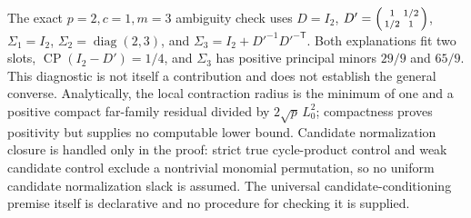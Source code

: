 The exact \(p=2,c=1,m=3\) ambiguity check uses \(D=I_2\), \(D'=\begin{psmallmatrix}1&1/2\\1/2&1\end{psmallmatrix}\), \(\Sigma_1=I_2\), \(\Sigma_2=\operatorname{diag}(2,3)\), and \(\Sigma_3=I_2+D'^{-1}D'^{-\mathsf T}\). Both explanations fit two slots, \(\operatorname{CP}(I_2-D')=1/4\), and \(\Sigma_3\) has positive principal minors \(29/9\) and \(65/9\). This diagnostic is not itself a contribution and does not establish the general converse. Analytically, the local contraction radius is the minimum of one and a positive compact far-family residual divided by \(2\sqrt p\,L_0^2\); compactness proves positivity but supplies no computable lower bound. Candidate normalization closure is handled only in the proof: strict true cycle-product control and weak candidate control exclude a nontrivial monomial permutation, so no uniform candidate normalization slack is assumed. The universal candidate-conditioning premise itself is declarative and no procedure for checking it is supplied.